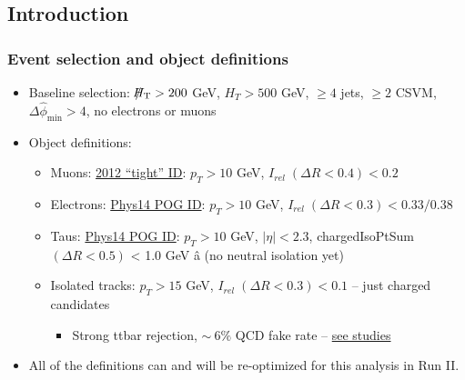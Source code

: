 \documentclass{beamer}
\begin{document}
\subsection{Introduction}
\begin{frame}
  \frametitle{Event selection and object definitions}
  \begin{itemize}
  \item Baseline selection: $\slash\mkern-12mu{H}_{\text{T}}>200$ GeV,
    $H_{T}>500$ GeV, $\geq4$ jets, $\geq2$ CSVM,
    $\Delta\hat{\phi}_{\mathrm{min}}>4$, no electrons or muons
  \item Object definitions:
    \begin{itemize}
    \item Muons: \href{https://twiki.cern.ch/twiki/bin/view/CMSPublic/SWGuideMuonId\#Tight\_Muon}{2012 ``tight'' ID}: $p_T > 10$ GeV, $I_{rel}\; (\Delta R<0.4) < 0.2$    
    \item Electrons: \href{https://twiki.cern.ch/twiki/bin/viewauth/CMS/CutBasedElectronIdentificationRun2\#CSA14\_selection\_conditions\_25ns}{Phys14 POG ID}:  $p_T > 10$ GeV, $I_{rel}\;
      (\Delta R<0.3) < 0.33 / 0.38$
    \item Taus: \href{https://indico.cern.ch/event/359233/contribution/4/material/slides/0.pdf}{Phys14 POG ID}: $p_T > 10$ GeV, $|\eta| < 2.3$,
      chargedIsoPtSum $(\Delta R<0.5)$ < 1.0 GeV â (no neutral isolation yet)
    \item Isolated tracks: $p_T > 15$ GeV, $I_{rel}\;(\Delta R<0.3) < 0.1$ -- just charged candidates
      \begin{itemize}
      \item Strong ttbar rejection, $\sim~6\%$ QCD fake rate -- \href{https://indico.cern.ch/event/334949/contribution/1/material/slides/0.pdf}{see studies}
      \end{itemize}

    \end{itemize}
  \item All of the definitions can and will be re-optimized for this
    analysis in Run II.
  \end{itemize}
\end{frame}
\end{document}
